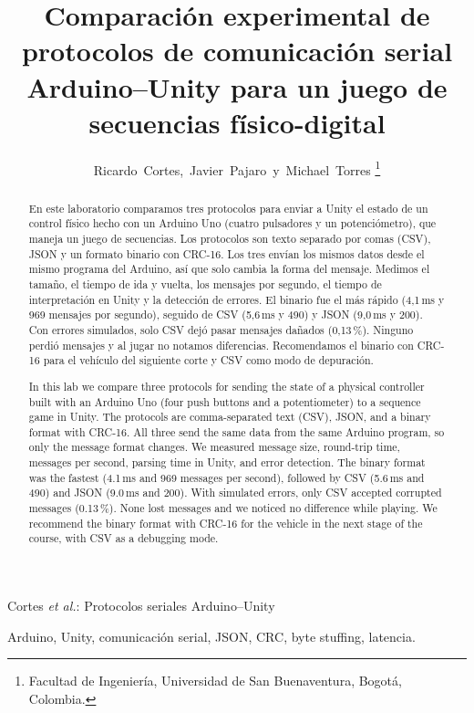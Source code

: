 \documentclass[journal]{IEEEtran}
\begin{document}
\title{Comparación experimental de protocolos de comunicación serial Arduino--Unity para un juego de secuencias físico-digital}
\author{Ricardo~Cortes,~Javier~Pajaro~y~Michael~Torres%
\thanks{Facultad de Ingeniería, Universidad de San Buenaventura, Bogotá, Colombia.}}

%
{Cortes \MakeLowercase{\textit{et al.}}: Protocolos seriales Arduino--Unity}

\maketitle

\begin{abstract}
En este laboratorio comparamos tres protocolos para enviar a Unity el estado de un control físico hecho con un Arduino Uno (cuatro pulsadores y un potenciómetro), que maneja un juego de secuencias. Los protocolos son texto separado por comas (CSV), JSON y un formato binario con CRC-16. Los tres envían los mismos datos desde el mismo programa del Arduino, así que solo cambia la forma del mensaje. Medimos el tamaño, el tiempo de ida y vuelta, los mensajes por segundo, el tiempo de interpretación en Unity y la detección de errores. El binario fue el más rápido (4,1\,ms y 969 mensajes por segundo), seguido de CSV (5,6\,ms y 490) y JSON (9,0\,ms y 200). Con errores simulados, solo CSV dejó pasar mensajes dañados (0,13\,\%). Ninguno perdió mensajes y al jugar no notamos diferencias. Recomendamos el binario con CRC-16 para el vehículo del siguiente corte y CSV como modo de depuración.
\end{abstract}

\renewcommand{\IEEEkeywordsname}{Palabras clave}
\begin{IEEEkeywords}
Arduino, Unity, comunicación serial, JSON, CRC, byte stuffing, latencia.
\end{IEEEkeywords}

{\renewcommand{\abstractname}{Abstract}
\begin{abstract}
In this lab we compare three protocols for sending the state of a physical controller built with an Arduino Uno (four push buttons and a potentiometer) to a sequence game in Unity. The protocols are comma-separated text (CSV), JSON, and a binary format with CRC-16. All three send the same data from the same Arduino program, so only the message format changes. We measured message size, round-trip time, messages per second, parsing time in Unity, and error detection. The binary format was the fastest (4.1\,ms and 969 messages per second), followed by CSV (5.6\,ms and 490) and JSON (9.0\,ms and 200). With simulated errors, only CSV accepted corrupted messages (0.13\,\%). None lost messages and we noticed no difference while playing. We recommend the binary format with CRC-16 for the vehicle in the next stage of the course, with CSV as a debugging mode.
\end{abstract}}
\end{document}
